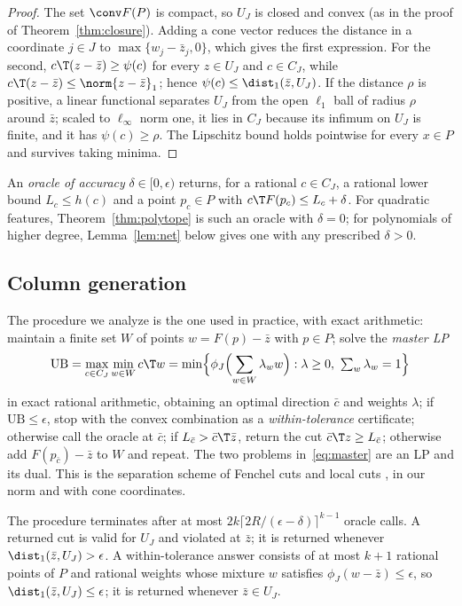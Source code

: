 \begin{proof}
The set $\conv F(P)$ is compact, so $U_J$ is closed and convex (as in the
proof of Theorem~\ref{thm:closure}). Adding a cone vector reduces the
distance in a coordinate $j\in J$ to $\max\{w_j-\bar z_j,0\}$, which gives
the first expression. For the second, $c\T(z-\bar z)\ge\psi(c)$ for every
$z\in U_J$ and $c\in C_J$, while $c\T(z-\bar z)\le\norm{z-\bar z}_1$; hence
$\psi(c)\le\dist_1(\bar z,U_J)$. If the distance $\rho$ is positive, a
linear functional separates $U_J$ from the open $\ell_1$ ball of radius
$\rho$ around $\bar z$; scaled to $\ell_\infty$ norm one, it lies in $C_J$
because its infimum on $U_J$ is finite, and it has $\psi(c)\ge\rho$. The
Lipschitz bound holds pointwise for every $x\in P$ and survives taking
minima.
\end{proof}

An \emph{oracle of accuracy} $\delta\in[0,\epsilon)$ returns, for a rational
$c\in C_J$, a rational lower bound $L_c\le h(c)$ and a point $p_c\in P$ with
$c\T F(p_c)\le L_c+\delta$. For quadratic features, Theorem~\ref{thm:polytope}
is such an oracle with $\delta=0$; for polynomials of higher degree,
Lemma~\ref{lem:net} below gives one with any prescribed $\delta>0$.

\subsection{Column generation}

The procedure we analyze is the one used in practice, with exact
arithmetic: maintain a finite set $W$ of points $w=F(p)-\bar z$ with
$p\in P$; solve the \emph{master LP}
\begin{equation}\label{eq:master}
\mathrm{UB}=\max_{c\in C_J}\min_{w\in W}c\T w
=\min\Bigl\{\phi_J\Bigl(\sum_{w\in W}\lambda_ww\Bigr):\lambda\ge0,\ \textstyle\sum_w\lambda_w=1\Bigr\}
\end{equation}
in exact rational arithmetic, obtaining an optimal direction $\bar c$ and
weights $\lambda$; if $\mathrm{UB}\le\epsilon$, stop with the convex
combination as a \emph{within-tolerance} certificate; otherwise call the
oracle at $\bar c$; if $L_{\bar c}>\bar c\T\bar z$, return the cut
$\bar c\T z\ge L_{\bar c}$; otherwise add $F(p_{\bar c})-\bar z$ to $W$ and
repeat. The two problems in~\eqref{eq:master} are an LP and its dual. This
is the separation scheme of Fenchel cuts and local cuts
\citep{Boyd1994,ChvatalCookEspinoza2013}, in our norm and with cone
coordinates.

\begin{theorem}\label{thm:weak-separation}
The procedure terminates after at most
$2k\lceil2R/(\epsilon-\delta)\rceil^{k-1}$ oracle calls. A returned cut is
valid for $U_J$ and violated at $\bar z$; it is returned whenever
$\dist_1(\bar z,U_J)>\epsilon$. A within-tolerance answer consists of at
most $k+1$ rational points of $P$ and rational weights whose mixture $w$
satisfies $\phi_J(w-\bar z)\le\epsilon$, so $\dist_1(\bar z,U_J)\le\epsilon$;
it is returned whenever $\bar z\in U_J$.
\end{theorem}

